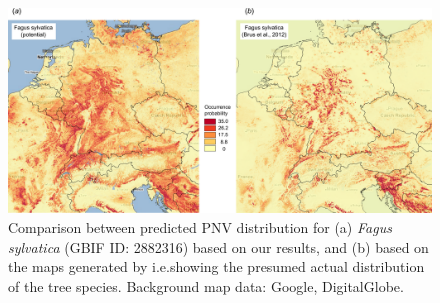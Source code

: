\documentclass[fleqn,10pt,lineno]{wlpeerj} %
\begin{document}
\begin{figure}[!hbt]
\centering
\includegraphics[width=\linewidth]{Fig_10.png}
\caption{Comparison between predicted PNV distribution for (a) \emph{Fagus sylvatica} (GBIF ID: 2882316) based on our results, and (b) based on the maps generated by \citet{brus2012statistical} i.e.\@ showing the presumed actual distribution of the tree species. Background map data: Google, DigitalGlobe.}
\label{Fig_EU_forest_Fagus_sylvatica}
\end{figure}
\end{document}
